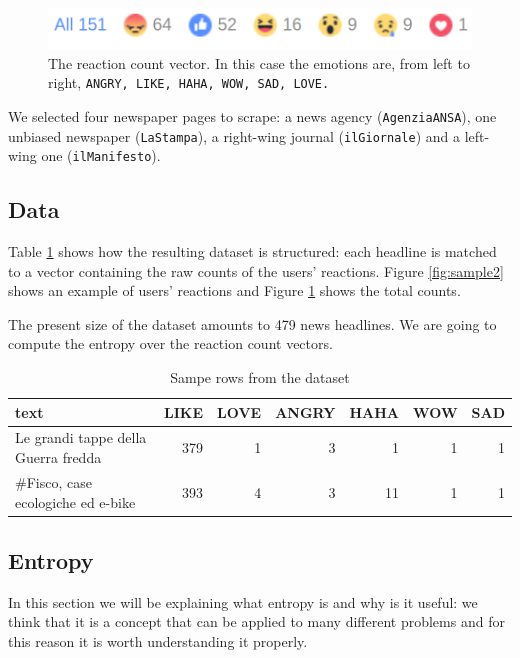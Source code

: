 \documentclass[article,11pt,nofixltx2e]{article}
\begin{document}
\begin{figure}[htb]
\centering
\includegraphics[width=.9\linewidth]{./img/sample3.png}
\caption{\label{fig:sample3}The reaction count vector. In this case the emotions are, from left to right, \texttt{ANGRY, LIKE, HAHA, WOW, SAD, LOVE.}}
\end{figure}

We selected four newspaper pages to scrape: a news agency (\texttt{AgenziaANSA}), one unbiased newspaper (\texttt{LaStampa}), a right-wing journal (\texttt{ilGiornale}) and a left-wing one (\texttt{ilManifesto}).

\subsection{Data}
\label{sec-2-2}

Table \ref{tab:sample-dataset} shows how the resulting dataset is structured: each headline is matched to a vector containing the raw counts of the users' reactions. Figure \ref{fig:sample2} shows an example of users' reactions and Figure \ref{fig:sample3} shows the total counts.

The present size of the dataset amounts to 479 news headlines. We are going to compute the entropy over the reaction count vectors.

\begin{table}[htb]
\caption{\label{tab:sample-dataset}Sampe rows from the dataset}
\centering
\begin{tabular}{lrrrrrr}
text & LIKE & LOVE & ANGRY & HAHA & WOW & SAD\\
\hline
Le grandi tappe della Guerra fredda & 379 & 1 & 3 & 1 & 1 & 1\\
\#Fisco, case ecologiche ed e-bike & 393 & 4 & 3 & 11 & 1 & 1\\
\end{tabular}
\end{table}

\subsection{Entropy}
\label{sec-2-3}

In this section we will be explaining what entropy is and why is it useful: we think that it is a concept that can be applied to many different problems and for this reason it is worth understanding it properly.
\end{document}
